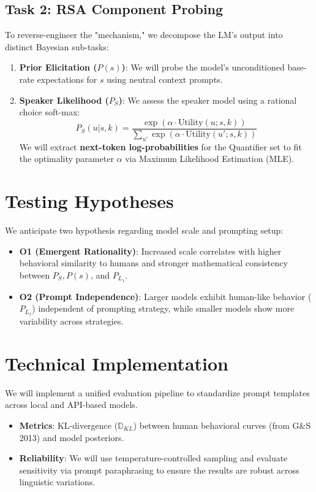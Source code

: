 \documentclass[11pt]{article}
\begin{document}
\subsection{Task 2: RSA Component Probing}
To reverse-engineer the "mechanism," we decompose the LM's output into distinct Bayesian sub-tasks:
\begin{enumerate}
    \item \textbf{Prior Elicitation ($P(s)$)}: We will probe the model's unconditioned base-rate expectations for $s$ using neutral context prompts.
    \item \textbf{Speaker Likelihood ($P_S$)}: We assess the speaker model using a rational choice soft-max:
    \begin{equation}
    P_S(u | s, k) = \frac{\exp(\alpha \cdot \text{Utility}(u; s, k))}{\sum_{u'} \exp(\alpha \cdot \text{Utility}(u'; s, k))}
    \end{equation}
    We will extract \textbf{next-token log-probabilities} for the Quantifier set to fit the optimality parameter $\alpha$ via Maximum Likelihood Estimation (MLE).
\end{enumerate}

\section{Testing Hypotheses}
We anticipate two hypothesis regarding model scale and prompting setup:
\begin{itemize}
    \item \textbf{O1 (Emergent Rationality)}: Increased scale correlates with higher behavioral similarity to humans and stronger mathematical consistency between $P_S, P(s)$, and $P_{L_1}$.
    \item \textbf{O2 (Prompt Independence)}: Larger models exhibit human-like behavior ($P_{L_1}$) independent of prompting strategy, while smaller models show more variability across strategies.
\end{itemize}

\section{Technical Implementation}
We will implement a unified evaluation pipeline to standardize prompt templates across local and API-based models. 
\begin{itemize}
    \item \textbf{Metrics}: KL-divergence ($\mathbb{D}_{KL}$) between human behavioral curves (from G\&S 2013) and model posteriors.
    \item \textbf{Reliability}: We will use temperature-controlled sampling and evaluate sensitivity via prompt paraphrasing to ensure the results are robust across linguistic variations.
\end{itemize}
\end{document}
